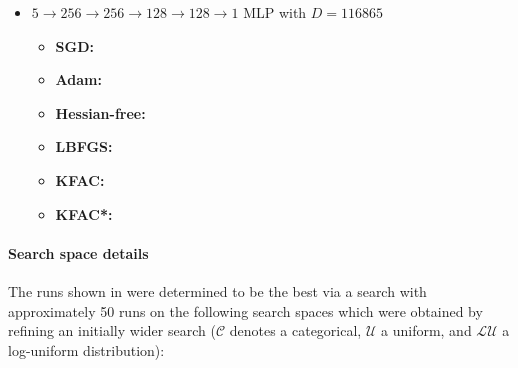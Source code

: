 \begin{itemize}
\item $5 \to 256 \to 256\to 128 \to 128 \to 1$ MLP with $D=\num{116865}$
  \begin{itemize}
    \def\pathToRuns{../kfac_pinns_exp/exp29_heat4d_big/tex}
  \item \textbf{SGD:} 
  \item \textbf{Adam:} 
  \item \textbf{Hessian-free:} 
  \item \textbf{LBFGS:} 
  \item \textbf{KFAC:} 
  \item \textbf{KFAC*:} 
  \end{itemize}
\end{itemize}

\paragraph{Search space details} The runs shown in  were determined to be the best via a search with approximately 50 runs on the following search spaces which were obtained by refining an initially wider search ($\mathcal{C}$ denotes a categorical, $\mathcal{U}$ a uniform, and $\mathcal{LU}$ a log-uniform distribution):

